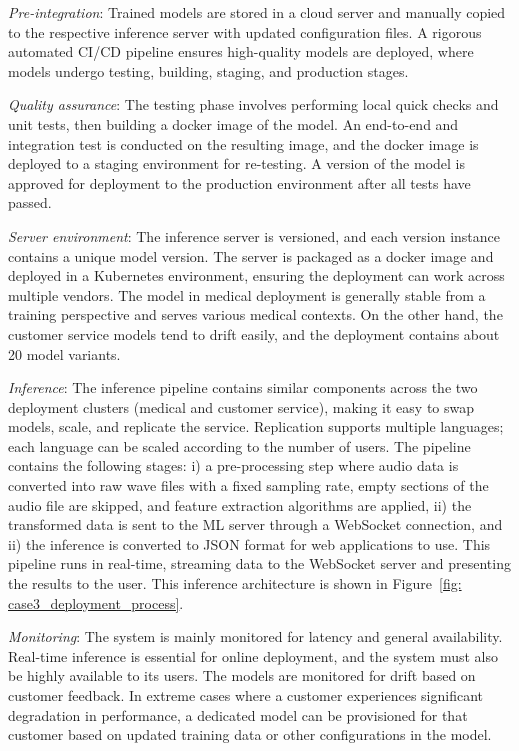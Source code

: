 \textit{Pre-integration}: Trained models are stored in a cloud server and manually copied to the respective inference server with updated configuration files. A rigorous automated CI/CD pipeline ensures high-quality models are deployed, where models undergo testing, building, staging, and production stages. 

\textit{Quality assurance}: The testing phase involves performing local quick checks and unit tests, then building a docker image of the model. An end-to-end and integration test is conducted on the resulting image, and the docker image is deployed to a staging environment for re-testing. A version of the model is approved for deployment to the production environment after all tests have passed. 

\textit{Server environment}: The inference server is versioned, and each version instance contains a unique model version. The server is packaged as a docker image and deployed in a Kubernetes environment, ensuring the deployment can work across multiple vendors. The model in medical deployment is generally stable from a training perspective and serves various medical contexts. On the other hand, the customer service models tend to drift easily, and the deployment contains about 20 model variants. %

\textit{Inference}: The inference pipeline contains similar components across the two deployment clusters (medical and customer service), making it easy to swap models, scale, and replicate the service. Replication supports multiple languages; each language can be scaled according to the number of users. The pipeline contains the following stages: i) a pre-processing step where audio data is converted into raw wave files with a fixed sampling rate, empty sections of the audio file are skipped, and feature extraction algorithms are applied, ii) the transformed data is sent to the ML server through a WebSocket connection, and ii) the inference is converted to JSON format for web applications to use. This pipeline runs in real-time, streaming data to the WebSocket server and presenting the results to the user. This inference architecture is shown in Figure~\ref{fig: case3_deployment_process}.

\textit{Monitoring}: The system is mainly monitored for latency and general availability. Real-time inference is essential for online deployment, and the system must also be highly available to its users. The models are monitored for drift based on customer feedback. In extreme cases where a customer experiences significant degradation in performance, a dedicated model can be provisioned for that customer based on updated training data or other configurations in the model.

